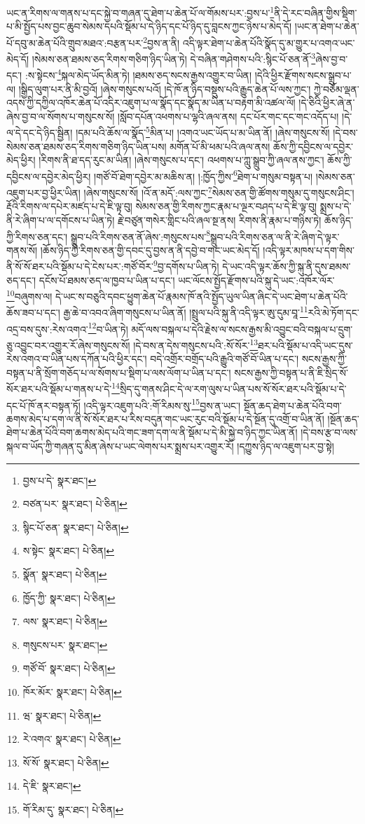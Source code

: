ཡང་ན་རིགས་ལ་གནས་པ་དང་སྐྱེ་བ་གཞན་དུ་ཐེག་པ་ཆེན་པོ་ལ་གོམས་པར་:བྱས་པ་\footnote{བྱས་པ་དེ་  སྣར་ཐང་། }ནི་དེ་རང་བཞིན་གྱིས་སྡིག་པ་མི་སྤྱོད་པས་བྱང་ཆུབ་སེམས་དཔའི་སྡོམ་པ་དེ་ཉིད་དང་པོ་ཉིད་དུ་བླངས་ཀྱང་ཉེས་པ་མེད་དོ། །ཡང་ན་ཐེག་པ་ཆེན་པོ་དབུ་མ་ཆེན་པོའི་གྲུབ་མཐའ་:བརྩན་པར་\footnote{བཙན་པར་  སྣར་ཐང་།  པེ་ཅིན། }བྱས་ན་ནི། འདི་ལྟར་ཐེག་པ་ཆེན་པོའི་སྣོད་དུ་མ་གྱུར་པ་འགའ་ཡང་མེད་དོ། །སེམས་ཅན་ཐམས་ཅད་རིགས་གཅིག་ཉིད་ཡིན་ཏེ། དེ་བཞིན་གཤེགས་པའི་:སྙིང་པོ་ཅན་ནོ་\footnote{སྙིང་པོ་ཅན་  སྣར་ཐང་།  པེ་ཅིན། }ཞེས་བྱ་བ་དང་། :ས་སྟེངས་\footnote{ས་སྟེང་  སྣར་ཐང་།  པེ་ཅིན། }སྐལ་མེད་ཡོད་མིན་ཏེ། །ཐམས་ཅད་སངས་རྒྱས་འགྱུར་བ་ཡིན། །དེའི་ཕྱིར་རྫོགས་སངས་སྒྲུབ་པ་ལ། །སྒྱིད་ལུག་པར་ནི་མི་བྱའོ། །ཞེས་གསུངས་པའོ། །དེ་ཁོ་ན་ཉིད་བསྡུས་པའི་རྒྱུད་ཆེན་པོ་ལས་ཀྱང་། ཀྱེ་བཅོམ་ལྡན་འདས་ཀྱི་དཀྱིལ་འཁོར་ཆེན་པོ་འདིར་འཇུག་པ་ལ་སྣོད་དང་སྣོད་མ་ཡིན་པ་བརྟག་མི་འཚལ་ལོ། །དེ་ཅིའི་ཕྱིར་ཞེ་ན་ཞེས་བྱ་བ་ལ་སོགས་པ་གསུངས་སོ། །སློབ་དཔོན་འཕགས་པ་ལྷའི་ཞལ་ནས། དང་པོར་གང་དང་གང་འདོད་པ། །དེ་ལ་དེ་དང་དེ་ཉིད་སྦྱིན། །དམ་པའི་ཆོས་ལ་སྣོད་\footnote{སྣོན་  སྣར་ཐང་།  པེ་ཅིན། }མིན་པ། །འགའ་ཡང་ཡོད་པ་མ་ཡིན་ནོ། །ཞེས་གསུངས་སོ། །དེ་བས་སེམས་ཅན་ཐམས་ཅད་རིགས་གཅིག་ཉིད་ཡིན་པས། མགོན་པོ་མི་ཕམ་པའི་ཞལ་ནས། ཆོས་ཀྱི་དབྱིངས་ལ་དབྱེར་མེད་ཕྱིར། །རིགས་ནི་ཐ་དད་རུང་མ་ཡིན། །ཞེས་གསུངས་པ་དང་། འཕགས་པ་ཀླུ་སྒྲུབ་ཀྱི་ཞལ་ནས་ཀྱང་། ཆོས་ཀྱི་དབྱིངས་ལ་དབྱེར་མེད་ཕྱིར། །གཙོ་བོ་ཐེག་དབྱེར་མ་མཆིས་ན། །:ཁྱོད་ཀྱིས་\footnote{ཁྱོད་ཀྱི་  སྣར་ཐང་།  པེ་ཅིན། }ཐེག་པ་གསུམ་བསྟན་པ། །སེམས་ཅན་འཇུག་པར་བྱ་ཕྱིར་ཡིན། །ཞེས་གསུངས་སོ། །འོ་ན་མདོ་:ལས་ཀྱང་\footnote{ལས་  སྣར་ཐང་།  པེ་ཅིན། }སེམས་ཅན་གྱི་ཚོགས་གསུམ་དུ་གསུངས་ཤིང་། རྡོའི་རིགས་ལ་དཔེར་མཛད་པ་དེ་ཇི་ལྟ་བུ། སེམས་ཅན་གྱི་རིགས་ཀྱང་རྣམ་པ་ལྔར་བཤད་པ་དེ་ཇི་ལྟ་བུ། སྨྲས་པ་དེ་ནི་རེ་ཞིག་པ་ལ་དགོངས་པ་ཡིན་ཏེ། རྗེ་བཙུན་གསེར་གླིང་པའི་ཞལ་སྔ་ནས། རིགས་ནི་རྣམ་པ་གཉིས་ཏེ། ཆོས་ཉིད་ཀྱི་རིགས་ཅན་དང་། སྒྲུབ་པའི་རིགས་ཅན་ནོ་ཞེས་:གསུངས་པས་\footnote{གསུངས་པར་  སྣར་ཐང་། }སྒྲུབ་པའི་རིགས་ཅན་ལ་ནི་རེ་ཞིག་དེ་ལྟར་གནས་སོ། །ཆོས་ཉིད་ཀྱི་རིགས་ཅན་གྱི་དབང་དུ་བྱས་ན་ནི་དབྱེ་བ་གང་ཡང་མེད་དོ། །འདི་ལྟར་མཁས་པ་དག་གིས་ནི་སོ་སོ་ཐར་པའི་སྡོམ་པ་དེ་ངེས་པར་:གཙོ་བོར་\footnote{གཙོ་བོ་  སྣར་ཐང་།  པེ་ཅིན། }བྱ་དགོས་པ་ཡིན་ཏེ། དེ་ཡང་འདི་ལྟར་ཆོས་ཀྱི་སྐུ་ནི་དུས་ཐམས་ཅད་དང་། དངོས་པོ་ཐམས་ཅད་ལ་ཁྱབ་པ་ཡིན་པ་དང་། ཡང་ལོངས་སྤྱོད་རྫོགས་པའི་སྐུ་དེ་ཡང་:འཁོར་ལོར་\footnote{ཁོར་མོར་  སྣར་ཐང་།  པེ་ཅིན། }བཞུགས་ལ། དེ་ཡང་ས་བཅུའི་དབང་ཕྱུག་ཆེན་པོ་རྣམས་ཁོ་ནའི་སྤྱོད་ཡུལ་ཡིན་ཞིང་དེ་ཡང་ཐེག་པ་ཆེན་པོའི་ཆོས་ཟབ་པ་དང་། རྒྱ་ཆེ་བ་འབའ་ཞིག་གསུངས་པ་ཡིན་ནོ། །སྤྲུལ་པའི་སྐུ་ནི་འདི་ལྟར་ཨུ་དུམ་བཱ་\footnote{ཝ་  སྣར་ཐང་།  པེ་ཅིན། }རའི་མེ་ཏོག་དང་འདྲ་བས་དུས་:རེས་འགའ་\footnote{རེ་འགའ་  སྣར་ཐང་།  པེ་ཅིན། }བ་ཡིན་ཏེ། མདོ་ལས་བསྐལ་པ་དེའི་རྗེས་ལ་སངས་རྒྱས་མི་འབྱུང་བའི་བསྐལ་པ་དྲུག་ཅུ་འབྱུང་བར་འགྱུར་རོ་ཞེས་གསུངས་སོ། །དེ་བས་ན་དེས་གསུངས་པའི་:སོ་སོར་\footnote{སོ་སོ་  སྣར་ཐང་།  པེ་ཅིན། }ཐར་པའི་སྡོམ་པ་འདི་ཡང་དུས་རེས་འགའ་བ་ཡིན་པས་དཀོན་པའི་ཕྱིར་དང་། བདེ་འགྲོར་བགྲོད་པའི་རྒྱུའི་གཙོ་བོ་ཡིན་པ་དང་། སངས་རྒྱས་ཀྱི་བསྟན་པ་ནི་སྲོག་གཅོད་པ་ལ་སོགས་པ་སྡིག་པ་ལས་ལོག་པ་ཡིན་པ་དང་། སངས་རྒྱས་ཀྱི་བསྟན་པ་ནི་ཇི་སྲིད་སོ་སོར་ཐར་པའི་སྡོམ་པ་གནས་པ་དེ་\footnote{དེ་ཇི་  སྣར་ཐང་། }སྲིད་དུ་གནས་ཤིང་དེ་ལ་རག་ལུས་པ་ཡིན་པས་སོ་སོར་ཐར་པའི་སྡོམ་པ་དེ་དང་པོ་ཁོ་ནར་བསྟན་ཏོ། །འདི་ལྟར་འཇུག་པའི་:གོ་རིམས་སུ་\footnote{གོ་རིམ་དུ་  སྣར་ཐང་།  པེ་ཅིན། }བྱས་ན་ཡང་། སྔོན་ཆད་ཐེག་པ་ཆེན་པོའི་བག་ཆགས་མེད་པ་དག་ལ་ནི་སོ་སོར་ཐར་པ་རིས་བདུན་གང་ཡང་རུང་བའི་སྡོམ་པ་དེ་སྔོན་དུ་འགྲོ་བ་ཡིན་ནོ། །སྔོན་ཆད་ཐེག་པ་ཆེན་པོའི་བག་ཆགས་མེད་པའི་གང་ཟག་དག་ལ་ནི་སྡོམ་པ་དེ་མི་སྐྱེ་བ་ཉིད་ཀྱང་ཡིན་ནོ། །དེ་བས་རྩ་བ་ལས་སྐལ་བ་ཡོད་ཀྱི་གཞན་དུ་མིན་ཞེས་པ་ཡང་ལེགས་པར་སྨྲས་པར་འགྱུར་རོ། །དཀྱུས་ཉིད་ལ་འཇུག་པར་བྱ་སྟེ། 